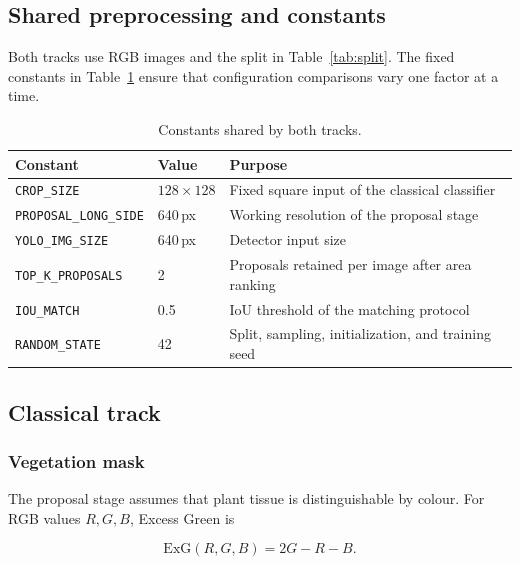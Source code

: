 \documentclass[a4paper,8pt]{article}
\begin{document}
\subsection{Shared preprocessing and constants}

Both tracks use RGB images and the split in Table~\ref{tab:split}. The fixed constants in
Table~\ref{tab:constants} ensure that configuration comparisons vary one factor at a time.

\begin{table}[H]
\centering
\small
\renewcommand{\arraystretch}{1.2}
\begin{tabularx}{0.95\textwidth}{|l|l|>{\raggedright\arraybackslash}X|}
\hline
\textbf{Constant} & \textbf{Value} & \textbf{Purpose}\\
\hline
\texttt{CROP\_SIZE} & $128 \times 128$ & Fixed square input of the classical classifier\\
\hline
\texttt{PROPOSAL\_LONG\_SIDE} & 640\,px & Working resolution of the proposal stage\\
\hline
\texttt{YOLO\_IMG\_SIZE} & 640\,px & Detector input size\\
\hline
\texttt{TOP\_K\_PROPOSALS} & 2 & Proposals retained per image after area ranking\\
\hline
\texttt{IOU\_MATCH} & 0.5 & IoU threshold of the matching protocol\\
\hline
\texttt{RANDOM\_STATE} & 42 & Split, sampling, initialization, and training seed\\
\hline
\end{tabularx}
\caption{Constants shared by both tracks.}
\label{tab:constants}
\end{table}

\subsection{Classical track}
\label{sec:classical-method}

\subsubsection{Vegetation mask}

The proposal stage assumes that plant tissue is distinguishable by colour. For RGB values
$R,G,B$, Excess Green is

\begin{equation}
\mathrm{ExG}(R,G,B) = 2G - R - B .
\label{eq:exg}
\end{equation}
\end{document}

